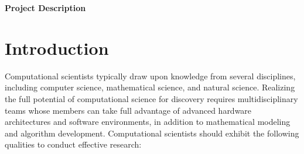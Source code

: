 \documentclass[11pt]{NSFamsart}
\begin{document}
\newpage \setcounter{page}{1} %





\centerline{\Large \textbf{Project Description}} \hypertarget{ProjDesc}{}
\vspace{-2ex}

\setcounter{tocdepth}{1}
\tableofcontents %

\vspace{-6ex}

\section{Introduction}
Computational scientists typically draw upon knowledge from several disciplines, including computer science, mathematical science, and natural science.  Realizing the full potential of computational science for discovery requires multidisciplinary teams whose members can take full advantage of advanced hardware architectures and software environments, in addition to mathematical modeling and algorithm development.  Computational scientists should exhibit the following qualities to conduct effective research:
\end{document}
